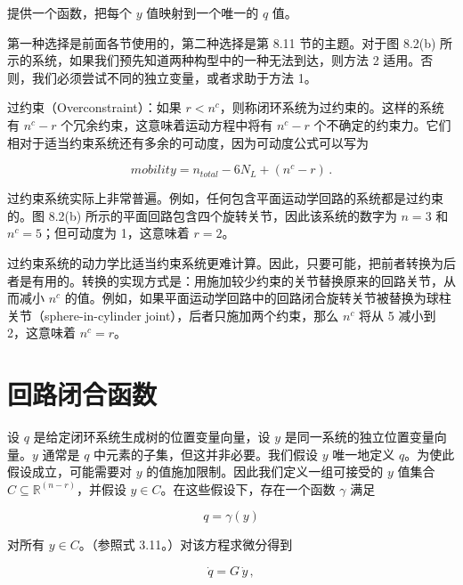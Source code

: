 \documentclass[10pt,a4paper]{book}
\theoremstyle{thmstyle} %
\theoremstyle{defstyle} %
\theoremstyle{prostyle} %
\begin{document}
提供一个函数，把每个 $y$ 值映射到一个唯一的 $q$ 值。



第一种选择是前面各节使用的，第二种选择是第 8.11 节的主题。对于图 8.2(b) 所示的系统，如果我们预先知道两种构型中的一种无法到达，则方法 2 适用。否则，我们必须尝试不同的独立变量，或者求助于方法 1。



过约束（Overconstraint）：如果 $r < n^{c}$，则称闭环系统为过约束的。这样的系统有 $n^{c} - r$ 个冗余约束，这意味着运动方程中将有 $n^{c} - r$ 个不确定的约束力。它们相对于适当约束系统还有多余的可动度，因为可动度公式可以写为



$$
mobility = n _ { total } - 6 N _ { L } + ( n ^{c} - r ) \, .
$$



过约束系统实际上非常普遍。例如，任何包含平面运动学回路的系统都是过约束的。图 8.2(b) 所示的平面回路包含四个旋转关节，因此该系统的数字为 $n=3$ 和 $n^{c}=5$；但可动度为 1，这意味着 $r=2$。



过约束系统的动力学比适当约束系统更难计算。因此，只要可能，把前者转换为后者是有用的。转换的实现方式是：用施加较少约束的关节替换原来的回路关节，从而减小 $n^{c}$ 的值。例如，如果平面运动学回路中的回路闭合旋转关节被替换为球柱关节（sphere-in-cylinder joint），后者只施加两个约束，那么 $n^{c}$ 将从 5 减小到 2，这意味着 $n^{c}=r$。



\section{回路闭合函数}





设 $q$ 是给定闭环系统生成树的位置变量向量，设 $y$ 是同一系统的独立位置变量向量。$y$ 通常是 $q$ 中元素的子集，但这并非必要。我们假设 $y$ 唯一地定义 $q$。为使此假设成立，可能需要对 $y$ 的值施加限制。因此我们定义一组可接受的 $y$ 值集合 $C \subseteq \mathbb{R}^{(n-r)}$，并假设 $y \in C$。在这些假设下，存在一个函数 $\gamma$ 满足



$$
q = \gamma ( y )
$$



对所有 $y \in C$。（参照式 3.11。）对该方程求微分得到



$$
\dot { q } = G \, \dot { y } \, ,
$$
\end{document}
